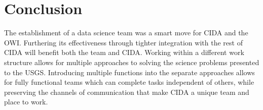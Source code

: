 \documentclass[twocolumn]{article}
\begin{document}
\section{Conclusion}

The establishment of a data science team was a smart move for CIDA and the OWI.
Furthering its effectiveness through tighter integration with the rest of CIDA will benefit both the team and CIDA.
Working within a different work structure allows for multiple approaches to solving the science problems presented to the USGS.
Introducing multiple functions into the separate approaches allows for fully functional teams which can complete tasks independent of others, while preserving the channels of communication that make CIDA a unique team and place to work.



\end{document}
